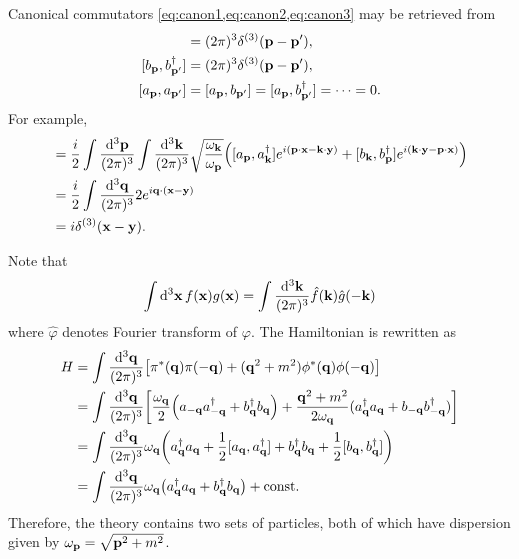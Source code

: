 \documentclass{article}
\begin{document}
Canonical commutators \cref{eq:canon1,eq:canon2,eq:canon3} may be retrieved from
\begin{align*}
    [a_{\vb{p}}, a^\dagger_{\vb{p}'}] &= (2\pi)^3 \delta^{(3)}(\vb{p} - \vb{p}'), \\
    [b_{\vb{p}}, b^\dagger_{\vb{p}'}] &= (2\pi)^3 \delta^{(3)}(\vb{p} - \vb{p}'), \\
    [a_{\vb{p}}, a_{\vb{p}'}] &= [a_{\vb{p}}, b_{\vb{p}'}] = [a_{\vb{p}}, b^\dagger_{\vb{p}'}] = \cdots = 0.
\end{align*}
For example,
\begin{align*}
    [\phi(\vb{x}),\pi(\vb{y})] &= \frac{i}{2} \int \frac{\dd{^3\vb{p}}}{(2\pi)^3} \int \frac{\dd{^3\vb{k}}}{(2\pi)^3} \sqrt{\frac{\omega_{\vb{k}}}{\omega_{\vb{p}}}} \qty([a_{\vb{p}}, a^\dagger_{\vb{k}}] e^{i(\vb{p}\cdot \vb{x} - \vb{k}\cdot \vb{y})} + [b_{\vb{k}},b^\dagger_{\vb{p}}]e^{i(\vb{k}\cdot \vb{y}-\vb{p}\cdot \vb{x})}) \\
    &= \frac{i}{2} \int \frac{\dd{^3\vb{q}}}{(2\pi)^3} 2 e^{i\vb{q}\cdot (\vb{x} - \vb{y})} \\
    &= i \delta^{(3)}(\vb{x} - \vb{y}).
\end{align*}

Note that
\begin{equation}
    \label{eq:ftconvolution} \int \dd{^3 \vb{x}} f(\vb{x}) g(\vb{x}) = \int \frac{\dd{^3\vb{k}}}{(2\pi)^3} \hat{f}(\vb{k}) \hat{g}(-\vb{k})
\end{equation}
where $\hat{\varphi}$ denotes Fourier transform of $\varphi$.
The Hamiltonian is rewritten as
\begin{align*}
    H &= \int \frac{\dd{^3\vb{q}}}{(2\pi)^3} \qty[\pi^*(\vb{q}) \pi(-\vb{q}) + (\vb{q}^2 + m^2)\phi^*(\vb{q})\phi(-\vb{q})] \\
    &= \int \frac{\dd{^3\vb{q}}}{(2\pi)^3} \qty[\frac{\omega_{\vb{q}}}{2}\qty(a_{-\vb{q}}a^\dagger_{-\vb{q}} + b^\dagger_{\vb{q}}b_{\vb{q}}) + \frac{\vb{q}^2+m^2}{2\omega_{\vb{q}}}(a_{\vb{q}}^\dagger a_{\vb{q}} + b_{-\vb{q}}b_{-\vb{q}}^\dagger)] \\
    &= \int \frac{\dd{^3\vb{q}}}{(2\pi)^3} \omega_{\vb{q}}\qty(a_{\vb{q}}^\dagger a_{\vb{q}} + \frac{1}{2}[a_{\vb{q}}, a_{\vb{q}}^\dagger] + b_{\vb{q}}^\dagger b_{\vb{q}} + \frac{1}{2}[b_{\vb{q}}, b_{\vb{q}}^\dagger]) \\
    &= \int \frac{\dd{^3\vb{q}}}{(2\pi)^3} \omega_{\vb{q}}\qty(a_{\vb{q}}^\dagger a_{\vb{q}} + b_{\vb{q}}^\dagger b_{\vb{q}}) + \mathrm{const}.
\end{align*}
Therefore, the theory contains two sets of particles, both of which have dispersion given by $\omega_{\vb{p}} = \sqrt{\vb{p}^2 + m^2}$.
\end{document}
